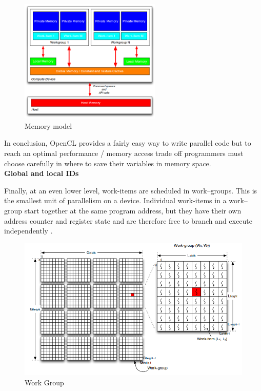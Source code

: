 \begin{figure}[H] \centering
  \includegraphics[width=0.6\textwidth]{./Figures/memory_model.png}
  \caption[Memory model]{Memory model \citep{Reference4}}
  \label{fig:memory_model} 
\end{figure}

In conclusion, OpenCL provides a fairly easy way to write parallel code but to
reach an optimal performance / memory access trade off programmers must choose
carefully in where to save their variables in memory space.\\

\textbf{Global and local IDs}

Finally, at an even lower level, work-items are scheduled in work–groups.
This is the smallest unit of parallelism on a device. Individual work-items in
a work–group  start together at the same program address, but they have their
own address counter and register state and are therefore free to branch and
execute independently \citep{Reference4}.\\

\begin{figure}[H] \centering
  \includegraphics[width=\textwidth]{./Figures/id.png} 
  \caption[Work - group]{Work Group \citep{Reference4}} 
  \label{fig:id} 
\end{figure}



